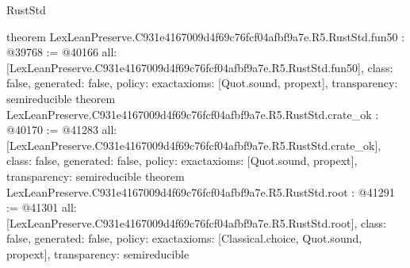 \begin{lexlean}{RustStd}
\begin{coremodule}
{}
theorem LexLeanPreserve.C931e4167009d4f69c76fcf04afbf9a7e.R5.RustStd.fun50 : @39768 := @40166 {
  all: [LexLeanPreserve.C931e4167009d4f69c76fcf04afbf9a7e.R5.RustStd.fun50],
  class: false,
  generated: false,
  policy: exact{axioms: [Quot.sound, propext]},
  transparency: semireducible
}
theorem LexLeanPreserve.C931e4167009d4f69c76fcf04afbf9a7e.R5.RustStd.crate_ok : @40170 := @41283 {
  all: [LexLeanPreserve.C931e4167009d4f69c76fcf04afbf9a7e.R5.RustStd.crate_ok],
  class: false,
  generated: false,
  policy: exact{axioms: [Quot.sound, propext]},
  transparency: semireducible
}
theorem LexLeanPreserve.C931e4167009d4f69c76fcf04afbf9a7e.R5.RustStd.root : @41291 := @41301 {
  all: [LexLeanPreserve.C931e4167009d4f69c76fcf04afbf9a7e.R5.RustStd.root],
  class: false,
  generated: false,
  policy: exact{axioms: [Classical.choice, Quot.sound, propext]},
  transparency: semireducible
}


\end{coremodule}
\end{lexlean}
